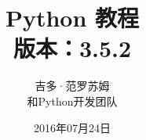 \title{\textbf{{\Huge Python 教程}\\版本：3.5.2}}
\author{吉多·范罗苏姆 \\和Python开发团队}
\date{\kaishu 2016年07月24日}
\maketitle 
